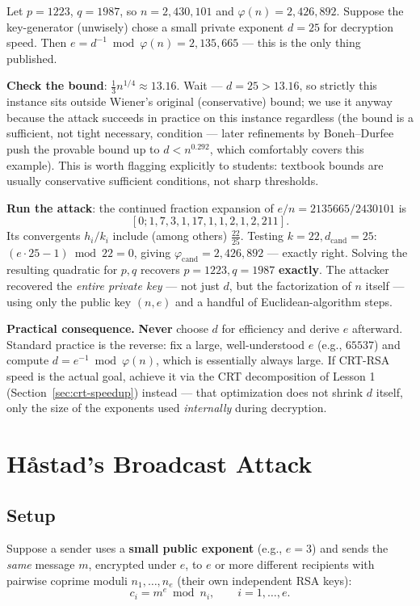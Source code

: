 \begin{example}
Let $p = 1223$, $q = 1987$, so $n = 2{,}430{,}101$ and $\varphi(n) = 2{,}426{,}892$. Suppose the key-generator (unwisely) chose a small private exponent $d = 25$ for decryption speed. Then $e = d^{-1} \bmod \varphi(n) = 2{,}135{,}665$ — this is the only thing published.

\textbf{Check the bound}: $\frac{1}{3}n^{1/4} \approx 13.16$. Wait — $d=25 > 13.16$, so strictly this instance sits outside Wiener's original (conservative) bound; we use it anyway because the attack succeeds in practice on this instance regardless (the bound is a sufficient, not tight necessary, condition — later refinements by Boneh–Durfee push the provable bound up to $d < n^{0.292}$, which comfortably covers this example). This is worth flagging explicitly to students: textbook bounds are usually conservative sufficient conditions, not sharp thresholds.

\textbf{Run the attack}: the continued fraction expansion of $e/n = 2135665/2430101$ is
\[
[0; 1, 7, 3, 1, 17, 1, 1, 2, 1, 2, 211].
\]
Its convergents $h_i/k_i$ include (among others) $\frac{22}{25}$. Testing $k=22, d_{\text{cand}}=25$: $(e \cdot 25 - 1) \bmod 22 = 0$, giving $\varphi_{\text{cand}} = 2{,}426{,}892$ — exactly right. Solving the resulting quadratic for $p,q$ recovers $p=1223, q=1987$ \textbf{exactly}. The attacker recovered the \emph{entire private key} — not just $d$, but the factorization of $n$ itself — using only the public key $(n,e)$ and a handful of Euclidean-algorithm steps.
\end{example}

\medskip\noindent\textbf{Practical consequence.} \textbf{Never} choose $d$ for efficiency and derive $e$ afterward. Standard practice is the reverse: fix a large, well-understood $e$ (e.g., $65537$) and compute $d = e^{-1} \bmod \varphi(n)$, which is essentially always large. If CRT-RSA speed is the actual goal, achieve it via the CRT decomposition of Lesson 1 (Section~\ref{sec:crt-speedup}) instead — that optimization does not shrink $d$ itself, only the size of the exponents used \emph{internally} during decryption.

\newpage
\section{Håstad's Broadcast Attack}

\subsection{Setup}
Suppose a sender uses a \textbf{small public exponent} (e.g., $e=3$) and sends the \emph{same} message $m$, encrypted under $e$, to $e$ or more different recipients with pairwise coprime moduli $n_1, \dots, n_e$ (their own independent RSA keys):
\[
c_i = m^e \bmod n_i, \qquad i = 1, \dots, e.
\]

